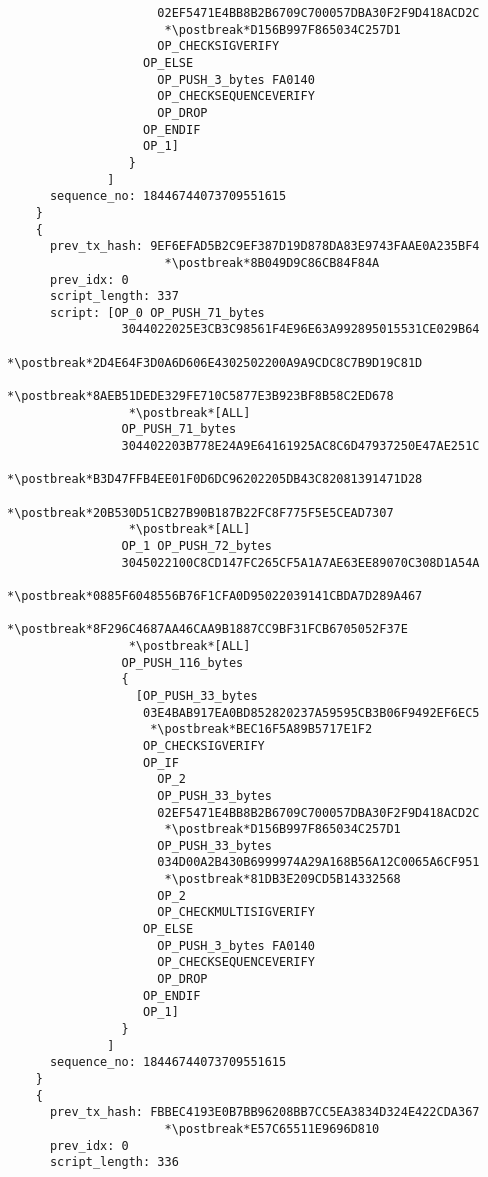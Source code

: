 \begin{lstlisting}
                     02EF5471E4BB8B2B6709C700057DBA30F2F9D418ACD2C
                      *\postbreak*D156B997F865034C257D1
                     OP_CHECKSIGVERIFY
                   OP_ELSE
                     OP_PUSH_3_bytes FA0140
                     OP_CHECKSEQUENCEVERIFY
                     OP_DROP
                   OP_ENDIF
                   OP_1]
                 }
              ]
      sequence_no: 18446744073709551615
    }
    {
      prev_tx_hash: 9EF6EFAD5B2C9EF387D19D878DA83E9743FAAE0A235BF4
                      *\postbreak*8B049D9C86CB84F84A
      prev_idx: 0
      script_length: 337
      script: [OP_0 OP_PUSH_71_bytes
                3044022025E3CB3C98561F4E96E63A992895015531CE029B64
                 *\postbreak*2D4E64F3D0A6D606E4302502200A9A9CDC8C7B9D19C81D
                 *\postbreak*8AEB51DEDE329FE710C5877E3B923BF8B58C2ED678
                 *\postbreak*[ALL]
                OP_PUSH_71_bytes
                304402203B778E24A9E64161925AC8C6D47937250E47AE251C
                 *\postbreak*B3D47FFB4EE01F0D6DC96202205DB43C82081391471D28
                 *\postbreak*20B530D51CB27B90B187B22FC8F775F5E5CEAD7307
                 *\postbreak*[ALL]
                OP_1 OP_PUSH_72_bytes
                3045022100C8CD147FC265CF5A1A7AE63EE89070C308D1A54A
                 *\postbreak*0885F6048556B76F1CFA0D95022039141CBDA7D289A467
                 *\postbreak*8F296C4687AA46CAA9B1887CC9BF31FCB6705052F37E
                 *\postbreak*[ALL]
                OP_PUSH_116_bytes
                {
                  [OP_PUSH_33_bytes
                   03E4BAB917EA0BD852820237A59595CB3B06F9492EF6EC5
                    *\postbreak*BEC16F5A89B5717E1F2
                   OP_CHECKSIGVERIFY
                   OP_IF
                     OP_2
                     OP_PUSH_33_bytes
                     02EF5471E4BB8B2B6709C700057DBA30F2F9D418ACD2C
                      *\postbreak*D156B997F865034C257D1
                     OP_PUSH_33_bytes
                     034D00A2B430B6999974A29A168B56A12C0065A6CF951
                      *\postbreak*81DB3E209CD5B14332568
                     OP_2
                     OP_CHECKMULTISIGVERIFY
                   OP_ELSE
                     OP_PUSH_3_bytes FA0140
                     OP_CHECKSEQUENCEVERIFY
                     OP_DROP
                   OP_ENDIF
                   OP_1]
                }
              ]
      sequence_no: 18446744073709551615
    }
    {
      prev_tx_hash: FBBEC4193E0B7BB96208BB7CC5EA3834D324E422CDA367
                      *\postbreak*E57C65511E9696D810
      prev_idx: 0
      script_length: 336

\end{lstlisting}
